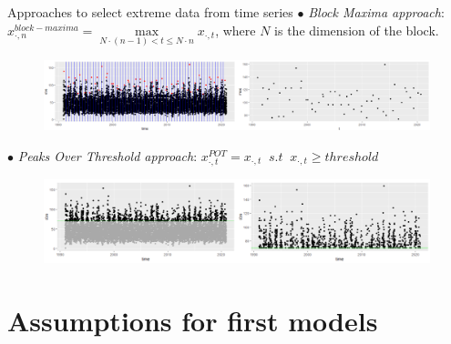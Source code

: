 \documentclass[usenames,dvipsnames]{beamer}
\begin{document}
\begin{frame}{Approaches to select extreme data from time series}
\small
    $\bullet$ \textit{Block Maxima approach}: \\
    $x_{\cdot,n}^{block-maxima}=\max\limits_{N\cdot (n-1) < t \leq  N \cdot n}{x_{\cdot,t}}$, where $N$ is the dimension of the block.  
       \begin{figure}[h!]
 \centering
  \includegraphics[width=1\textwidth]{BM_plot_1.png}
 \end{figure}
    
    $\bullet$ \textit{Peaks Over Threshold approach}:
    $x_{\cdot,t}^{POT}=x_{\cdot,t} \;\; s.t \;\; x_{\cdot,t} \geq threshold$
\begin{figure}[h!]
 \centering
  \includegraphics[width=1\textwidth]{POT_plot_1.png}
 \end{figure}
 
\end{frame}
\subsection{}

\section{Assumptions for first models}
\end{document}

